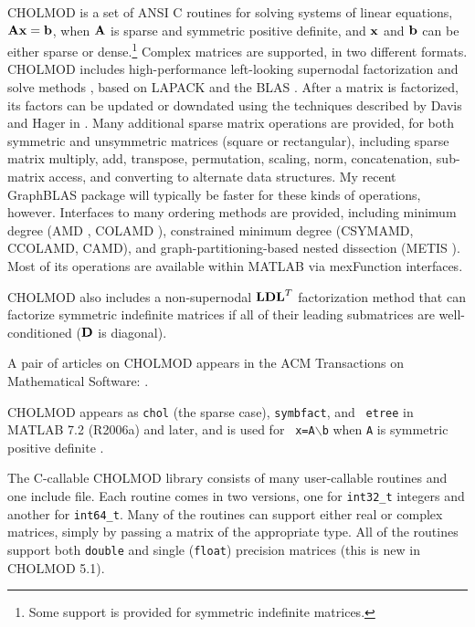 \documentclass[11pt]{article}
\newcommand{\m}[1]{{\bf{#1}}}       %
\begin{document}
CHOLMOD is a set of ANSI C routines for solving systems of linear equations,
$\m{Ax}=\m{b}$, when $\m{A}$ is sparse and symmetric positive definite, and
$\m{x}$ and $\m{b}$ can be either sparse or dense.\footnote{Some support is
provided for symmetric indefinite matrices.} Complex matrices are supported, in
two different formats.  CHOLMOD includes high-performance left-looking
supernodal factorization and solve methods \cite{NgPeyton91b}, based on LAPACK
\cite{LAPACK} and the BLAS \cite{ACM679a}.  After a matrix is factorized, its
factors can be updated or downdated using the techniques described by Davis and
Hager in \cite{DavisHager99,DavisHager01,DavisHager05}.  Many additional sparse
matrix operations are provided, for both symmetric and unsymmetric matrices
(square or rectangular), including sparse matrix multiply, add, transpose,
permutation, scaling, norm, concatenation, sub-matrix access, and converting to
alternate data structures.  My recent GraphBLAS package will typically be
faster for these kinds of operations, however.  Interfaces to many ordering
methods are provided, including minimum degree (AMD
\cite{AmestoyDavisDuff96,AmestoyDavisDuff03}, COLAMD
\cite{DavisGilbertLarimoreNg00_algo,DavisGilbertLarimoreNg00}), constrained
minimum degree (CSYMAMD, CCOLAMD, CAMD), and graph-partitioning-based nested
dissection (METIS \cite{KarypisKumar98}).  Most of its operations are available
within MATLAB via mexFunction interfaces.

CHOLMOD also includes a non-supernodal $\m{LDL}^T$ factorization method that
can factorize symmetric indefinite matrices if all of their leading submatrices
are well-conditioned ($\m{D}$ is diagonal).

A pair of articles on CHOLMOD appears in the ACM Transactions
on Mathematical Software:
\cite{ChenDavisHagerRajamanickam06,DavisHager06}.

CHOLMOD appears as {\tt chol} (the sparse case), {\tt symbfact}, and {\tt
etree} in MATLAB 7.2 (R2006a) and later, and is used for {\tt
x=A}$\backslash${\tt b} when {\tt A} is symmetric positive definite
\cite{GilbertMolerSchreiber}.

The C-callable CHOLMOD library consists of many user-callable routines and one
include file.  Each routine comes in two versions, one for {\tt int32\_t} integers
and another for {\tt int64\_t}.  Many of the routines can support either real or
complex matrices, simply by passing a matrix of the appropriate type.
All of the routines support both {\tt double} and single ({\tt float})
precision matrices (this is new in CHOLMOD 5.1).
\end{document}
